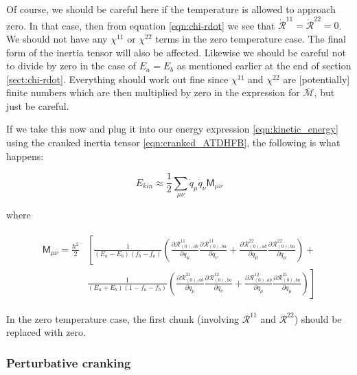 \noindent Of course, we should be careful here if the temperature is allowed to approach zero. In that case, then from equation \ref{eqn:chi-rdot} we see that $\mathcal{\dot{R}}^{11}=\mathcal{\dot{R}}^{22}=0$. We should not have any $\chi^{11}$ or $\chi^{22}$ terms in the zero temperature case. The final form of the inertia tensor will also be affected. Likewise we should be careful not to divide by zero in the case of $E_a=E_b$ as mentioned earlier at the end of section \ref{sect:chi-rdot}. Everything should work out fine since $\chi^{11}$ and $\chi^{22}$ are [potentially] finite numbers which are then multiplied by zero in the expression for $\mathcal{\bar{M}}$, but just be careful.

If we take this now and plug it into our energy expression \ref{eqn:kinetic_energy} using the cranked inertia tensor \ref{eqn:cranked_ATDHFB}, the following is what happens:

\begin{tcolorbox}
\begin{equation}
E_{kin} \approx \frac{1}{2}\sum_{\mu\nu}\dot{q}_\mu\dot{q}_\nu\mathsf{M}_{\mu\nu}
\end{equation}
\end{tcolorbox}

\noindent where

\begin{tcolorbox}
\begin{align}\label{crankedFiniteTempInertia}
\begin{aligned}
\mathsf{M}_{\mu\nu} =  \frac{\hbar^2}{2}&\left[\frac{1}{(E_a-E_b)(f_b-f_a)}\left(\frac{\partial\mathcal{R}^{11}_{(0),ab}}{\partial q_\mu}\frac{\partial\mathcal{R}^{11}_{(0),ba}}{\partial q_\nu}+\frac{\partial\mathcal{R}^{22}_{(0),ab}}{\partial q_\mu}\frac{\partial\mathcal{R}^{22}_{(0),ba}}{\partial q_\mu}\right)\right.+ \\
&\left.\frac{1}{(E_a+E_b)(1-f_a-f_b)}\left(\frac{\partial\mathcal{R}^{21}_{(0),ab}}{\partial q_\mu}\frac{\partial\mathcal{R}^{12}_{(0),ba}}{\partial q_\nu}+\frac{\partial\mathcal{R}^{12}_{(0),ab}}{\partial q_\mu}\frac{\partial\mathcal{R}^{21}_{(0),ba}}{\partial q_\mu}\right)\right]
\end{aligned}
\end{align}
\end{tcolorbox}

\noindent In the zero temperature case, the first chunk (involving $\mathcal{R}^{11}$ and $\mathcal{R}^{22}$) should be replaced with zero.

\subsubsection{Perturbative cranking}


